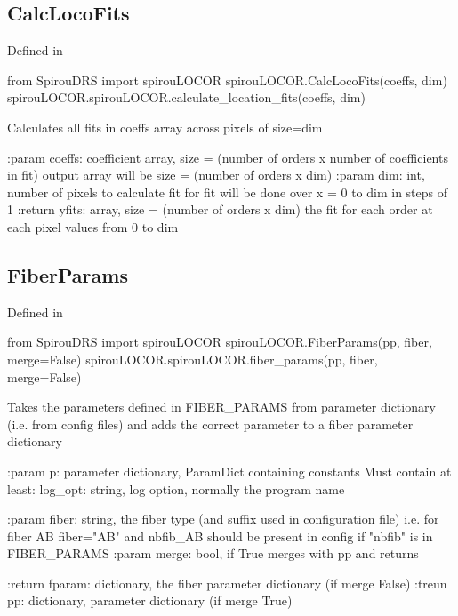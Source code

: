 \noindent\begin{minipage}{\textwidth}
\subsection{CalcLocoFits}

Defined in \spirouLOCOR{}

\begin{pythonbox}
from SpirouDRS import spirouLOCOR
spirouLOCOR.CalcLocoFits(coeffs, dim)
spirouLOCOR.spirouLOCOR.calculate_location_fits(coeffs, dim)
\end{pythonbox}

\begin{pythondocstring}
Calculates all fits in coeffs array across pixels of size=dim

:param coeffs: coefficient array,
               size = (number of orders x number of coefficients in fit)
               output array will be size = (number of orders x dim)
:param dim: int, number of pixels to calculate fit for
            fit will be done over x = 0 to dim in steps of 1
:return yfits: array,
               size = (number of orders x dim)
               the fit for each order at each pixel values from 0 to dim
\end{pythondocstring}
\end{minipage}

\noindent\begin{minipage}{\textwidth}
\subsection{FiberParams}

Defined in \spirouLOCOR{}

\begin{pythonbox}
from SpirouDRS import spirouLOCOR
spirouLOCOR.FiberParams(pp, fiber, merge=False)
spirouLOCOR.spirouLOCOR.fiber_params(pp, fiber, merge=False)
\end{pythonbox}

\begin{pythondocstring}
Takes the parameters defined in FIBER_PARAMS from parameter dictionary
(i.e. from config files) and adds the correct parameter to a fiber
parameter dictionary

:param p: parameter dictionary, ParamDict containing constants
    Must contain at least:
            log_opt: string, log option, normally the program name

:param fiber: string, the fiber type (and suffix used in configuration file)
              i.e. for fiber AB fiber="AB" and nbfib_AB should be present
              in config if "nbfib" is in FIBER_PARAMS
:param merge: bool, if True merges with pp and returns

:return fparam: dictionary, the fiber parameter dictionary (if merge False)
:treun pp: dictionary, parameter dictionary (if merge True)
\end{pythondocstring}
\end{minipage}

